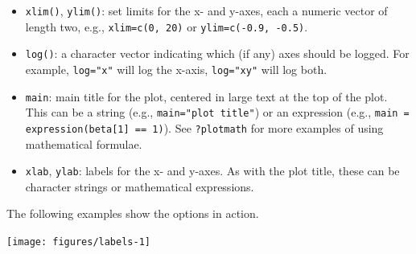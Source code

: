\begin{itemize}
\itemsep1pt\parskip0pt
\item
  \texttt{xlim()}, \texttt{ylim()}: set limits for the x- and y-axes,
  each a numeric vector of length two, e.g., \texttt{xlim=c(0, 20)} or
  \texttt{ylim=c(-0.9, -0.5)}. 
\item
  \texttt{log()}: a character vector indicating which (if any) axes
  should be logged. For example, \texttt{log="x"} will log the x-axis,
  \texttt{log="xy"} will log both.
\item
  \texttt{main}: main title for the plot, centered in large text at the
  top of the plot. This can be a string (e.g.,
  \texttt{main="plot title"}) or an expression (e.g.,
  \texttt{main = expression(beta{[}1{]} == 1)}). See \texttt{?plotmath}
  for more examples of using mathematical formulae. 
\item
  \texttt{xlab}, \texttt{ylab}: labels for the x- and y-axes. As with
  the plot title, these can be character strings or mathematical
  expressions. 
\end{itemize}

The following examples show the options in action.

\begin{Shaded}
\begin{Highlighting}[]
\NormalTok{>}\StringTok{ }\NormalTok{(}
\NormalTok{+}\StringTok{   } 
\NormalTok{+}\StringTok{   } \NormalTok{, } \NormalTok{,  }
\NormalTok{+}\StringTok{   } 
\NormalTok{+}\StringTok{ }\NormalTok{)}
\end{Highlighting}
\end{Shaded}

\begin{flushleft}\texttt{[image: figures/labels-1]} \end{flushleft}

\begin{Shaded}
\begin{Highlighting}[]
\NormalTok{>}\StringTok{ }\NormalTok{(}
\NormalTok{+}\StringTok{    } 
\NormalTok{+}\StringTok{    } \NormalTok{(}
\NormalTok{+}\StringTok{    } \NormalTok{,  }
\NormalTok{+}\StringTok{    } \NormalTok{, }
\NormalTok{+}\StringTok{    } \NormalTok{,}\NormalTok{)}
\NormalTok{+}\StringTok{ }\NormalTok{)}
\end{Highlighting}
\end{Shaded}


